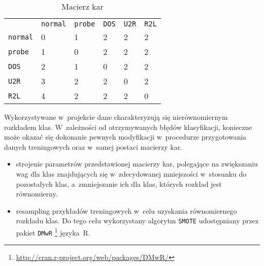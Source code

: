 \documentclass[a4paper, 12pt]{article}
\begin{document}
\begin{table}[H]
\centering
\begin{tabular}{ l l l l l l }
       & \texttt{normal}&\texttt{probe}	&\texttt{DOS}	&\texttt{U2R}	&\texttt{R2L} \\
\texttt{normal}	&0	&1	&2	&2	&2 \\
\texttt{probe}	&1	&0	&2	&2	&2 \\
\texttt{DOS}	&2	&1	&0	&2	&2 \\
\texttt{U2R}	&3	&2	&2	&0	&2 \\
\texttt{R2L}	&4	&2	&2	&2	&0 \\
\end{tabular}
\caption{Macierz kar}
\label{table:cov_matrix}
\end{table}

Wykorzystywane w~projekcie dane charakteryzują się nierównomiernym rozkładem klas. W~zależności od otrzymywanych błędów klasyfikacji, konieczne może okazać się dokonanie pewnych modyfikacji w~procedurze przygotowania danych treningowych oraz w~samej postaci macierzy kar. 
\begin{itemize}
	\item strojenie parametrów przedstawionej macierzy kar, polegające na zwiększaniu wag dla klas znajdujących się w~zdecydowanej mniejszości w~stosunku do pozostałych klas, a~zmniejszanie ich dla klas, których rozkład jest równomierny.
	\item resampling przykładów treningowych w~celu uzyskania równomiernego rozkładu klas. Do tego celu wykorzystany algorytm \texttt{SMOTE} udostępniany przez pakiet \texttt{DMwR} \footnote{\url{http://cran.r-project.org/web/packages/DMwR/}} języka~R.
\end{itemize}

\end{document}
